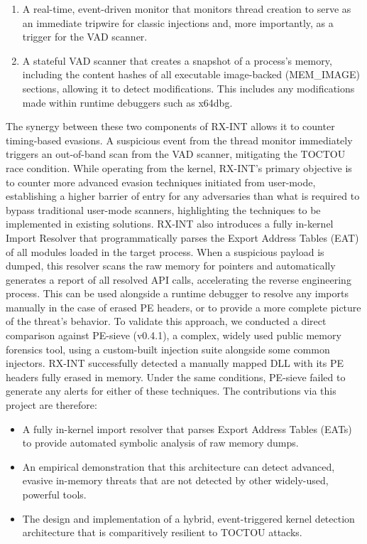 \documentclass[journal]{IEEEtran}
\begin{document}
\begin{enumerate}
\item A real-time, event-driven monitor that monitors thread creation to serve as an immediate tripwire for classic injections and, more importantly, as a trigger for the VAD scanner.
\item A stateful VAD scanner that creates a snapshot of a process's memory, including the content hashes of all executable image-backed (MEM\_IMAGE) sections, allowing it to detect modifications. This includes any modifications made within runtime debuggers such as x64dbg.
\end{enumerate}
The synergy between these two components of RX-INT allows it to counter timing-based evasions. A suspicious event from the thread monitor immediately triggers an out-of-band scan from the VAD scanner, mitigating the TOCTOU race condition. While operating from the kernel, RX-INT's primary objective is to counter more advanced evasion techniques initiated from user-mode, establishing a higher barrier of entry for any adversaries than what is required to bypass traditional user-mode scanners, highlighting the techniques to be implemented in existing solutions. RX-INT also introduces a fully in-kernel Import Resolver that programmatically parses the Export Address Tables (EAT) of all modules loaded in the target process. When a suspicious payload is dumped, this resolver scans the raw memory for pointers and automatically generates a report of all resolved API calls, accelerating the reverse engineering process. This can be used alongside a runtime debugger to resolve any imports manually in the case of erased PE headers, or to provide a more complete picture of the threat's behavior.
To validate this approach, we conducted a direct comparison against PE-sieve (v0.4.1), a complex, widely used public memory forensics tool, using a custom-built injection suite alongside some common injectors. RX-INT successfully detected a manually mapped DLL with its PE headers fully erased in memory. Under the same conditions, PE-sieve failed to generate any alerts for either of these techniques.
The contributions via this project are therefore:
\begin{itemize}
    \item A fully in-kernel import resolver that parses Export Address Tables (EATs) to provide automated symbolic analysis of raw memory dumps.
    \item An empirical demonstration that this architecture can detect advanced, evasive in-memory threats that are not detected by other widely-used, powerful tools.
    \item The design and implementation of a hybrid, event-triggered kernel detection architecture that is comparitively resilient to TOCTOU attacks.
\end{itemize}
\end{document}
